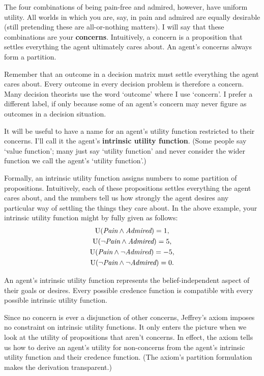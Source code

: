 The four combinations of being pain-free and admired, however, have uniform
utility. All worlds in which you are, say, in pain and admired are equally
desirable (still pretending these are all-or-nothing matters). I will say that
these combinations are your \textbf{concerns}. Intuitively, a concern is a
proposition that settles everything the agent ultimately cares about. An agent's
concerns always form a partition.

Remember that an outcome in a decision matrix must settle everything the agent
cares about. Every outcome in every decision problem is therefore a concern.
Many decision theorists use the word `outcome' where I use `concern'. I prefer a
different label, if only because some of an agent's concern may never figure as
outcomes in a decision situation.

It will be useful to have a name for an agent's utility function restricted to
their concerns. I'll call it the agent's \textbf{intrinsic utility function}.
(Some people say `value function'; many just say `utility function' and never
consider the wider function we call the agent's `utility function'.)

Formally, an intrinsic utility function assigns numbers to some partition of
propositions. Intuitively, each of these propositions settles everything the
agent cares about, and the numbers tell us how strongly the agent desires any
particular way of settling the things they care about. In the above example,
your intrinsic utility function might by fully given as follows:
\begin{gather*}
  \text{U}(\emph{Pain} \land \emph{Admired}) = 1,\\
  \text{U}(\neg\emph{Pain} \land \emph{Admired}) = 5,\\
  \text{U}(\emph{Pain} \land \neg \emph{Admired}) = -5,\\
  \text{U}(\neg \emph{Pain} \land \neg \emph{Admired}) = 0.
\end{gather*}

An agent's intrinsic utility function represents the belief-independent aspect
of their goals or desires. Every possible credence function is compatible with
every possible intrinsic utility function.

Since no concern is ever a disjunction of other concerns, Jeffrey's axiom
imposes no constraint on intrinsic utility functions. It only enters the picture
when we look at the utility of propositions that aren't concerns. In effect, the
axiom tells us how to derive an agent's utility for non-concerns from the
agent's intrinsic utility function and their credence function. (The axiom's
partition formulation makes the derivation transparent.)
 
